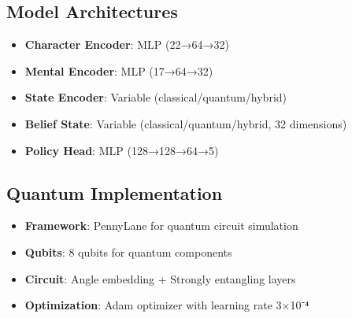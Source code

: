 \documentclass[11pt]{article}
\begin{document}
\subsection{Model Architectures}
\begin{itemize}
    \item \textbf{Character Encoder}: MLP (22→64→32)
    \item \textbf{Mental Encoder}: MLP (17→64→32)
    \item \textbf{State Encoder}: Variable (classical/quantum/hybrid)
    \item \textbf{Belief State}: Variable (classical/quantum/hybrid, 32 dimensions)
    \item \textbf{Policy Head}: MLP (128→128→64→5)
\end{itemize}

\subsection{Quantum Implementation}
\begin{itemize}
    \item \textbf{Framework}: PennyLane for quantum circuit simulation
    \item \textbf{Qubits}: 8 qubits for quantum components
    \item \textbf{Circuit}: Angle embedding + Strongly entangling layers
    \item \textbf{Optimization}: Adam optimizer with learning rate 3×10⁻⁴
\end{itemize}
\end{document}
